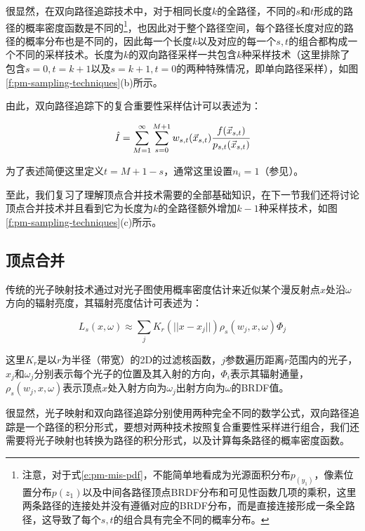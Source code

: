 很显然，在双向路径追踪技术中，对于相同长度$k$的全路径，不同的$s$和$t$形成的路径的概率密度函数是不同的\footnote{注意，对于式\ref{e:pm-mis-pdf}，不能简单地看成为光源面积分布$p_(y_1)$，像素位置分布$p(z_1)$以及中间各路径顶点BRDF分布和可见性函数几项的乘积，这里两条路径的连接处并没有遵循对应的BRDF分布，而是直接连接形成一条全路径，这导致了每个$s,t$的组合具有完全不同的概率分布。}，也因此对于整个路径空间，每个路径长度对应的路径的概率分布也是不同的，因此每一个长度$k$以及对应的每一个$s,t$的组合都构成一个不同的采样技术。长度为$k$的双向路径采样一共包含$k$种采样技术（这里排除了包含$s=0,t=k+1$以及$s=k+1,t=0$的两种特殊情况，即单向路径采样），如图\ref{f:pm-sampling-techniques}(b)所示。

由此，双向路径追踪下的复合重要性采样估计可以表述为：

\begin{equation}\label{e:pm-bpt-mis}
	\hat{I}=\sum^{\infty}_{M=1}\sum^{M+1}_{s=0}w_{s,t}(\vec{x}_{s,t}) \cfrac{f(\vec{x}_{s,t})}{p_{s,t}(\vec{x}_{s,t})}
\end{equation}

为了表述简便这里定义$t=M+1-s$，通常这里设置$n_i=1$（参见\cite{a:OptimallyCombiningSamplingTechniquesforMonteCarloRendering}）。

至此，我们复习了理解顶点合并技术需要的全部基础知识，在下一节我们还将讨论顶点合并技术并且看到它为长度为$k$的全路径额外增加$k-1$种采样技术，如图\ref{f:pm-sampling-techniques}(c)所示。





\subsection{顶点合并}
传统的光子映射技术通过对光子图使用概率密度估计来近似某个漫反射点$x$处沿$\omega$方向的辐射亮度，其辐射亮度估计可表述为\cite{a:GlobalIlluminationusingPhotonMaps}：

\begin{equation}
	L_s(x,\omega)\approx\sum_{j}K_r(||x-x_j||)\rho_s(w_j,x,\omega)\Phi_j
\end{equation}

\noindent 这里$K_r$是以$r$为半径（带宽）的2D的过滤核函数，$j$参数遍历距离$r$范围内的光子，$x_{j}$和$\omega_j$分别表示每个光子的位置及其入射的方向，$\Phi_i$表示其辐射通量，$\rho_s(w_j,x,\omega)$表示顶点$x$处入射方向为$\omega_j$出射方向为$\omega$的BRDF值。

很显然，光子映射和双向路径追踪分别使用两种完全不同的数学公式，双向路径追踪是一个路径的积分形式，要想对两种技术按照复合重要性采样进行组合，我们还需要将光子映射也转换为路径的积分形式，以及计算每条路径的概率密度函数。

